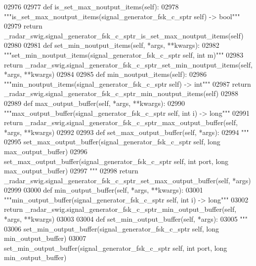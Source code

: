 \begin{DoxyCode}
{{{{{{{{{{{02976 
02977     \textcolor{keyword}{def }is_set_max_noutput_items(self):
02978         \textcolor{stringliteral}{"""is\_set\_max\_noutput\_items(signal\_generator\_fsk\_c\_sptr self) -> bool"""}
02979         \textcolor{keywordflow}{return} \_radar\_swig.signal\_generator\_fsk\_c\_sptr\_is\_set\_max\_noutput\_items(self)
02980 
02981     \textcolor{keyword}{def }set_min_noutput_items(self, *args, **kwargs):
02982         \textcolor{stringliteral}{"""set\_min\_noutput\_items(signal\_generator\_fsk\_c\_sptr self, int m)"""}
02983         \textcolor{keywordflow}{return} \_radar\_swig.signal\_generator\_fsk\_c\_sptr\_set\_min\_noutput\_items(self, *args, **kwargs)
02984 
02985     \textcolor{keyword}{def }min_noutput_items(self):
02986         \textcolor{stringliteral}{"""min\_noutput\_items(signal\_generator\_fsk\_c\_sptr self) -> int"""}
02987         \textcolor{keywordflow}{return} \_radar\_swig.signal\_generator\_fsk\_c\_sptr\_min\_noutput\_items(self)
02988 
02989     \textcolor{keyword}{def }max_output_buffer(self, *args, **kwargs):
02990         \textcolor{stringliteral}{"""max\_output\_buffer(signal\_generator\_fsk\_c\_sptr self, int i) -> long"""}
02991         \textcolor{keywordflow}{return} \_radar\_swig.signal\_generator\_fsk\_c\_sptr\_max\_output\_buffer(self, *args, **kwargs)
02992 
02993     \textcolor{keyword}{def }set_max_output_buffer(self, *args):
02994         \textcolor{stringliteral}{"""}
02995 \textcolor{stringliteral}{        set\_max\_output\_buffer(signal\_generator\_fsk\_c\_sptr self, long max\_output\_buffer)}
02996 \textcolor{stringliteral}{        set\_max\_output\_buffer(signal\_generator\_fsk\_c\_sptr self, int port, long max\_output\_buffer)}
02997 \textcolor{stringliteral}{        """}
02998         \textcolor{keywordflow}{return} \_radar\_swig.signal\_generator\_fsk\_c\_sptr\_set\_max\_output\_buffer(self, *args)
02999 
03000     \textcolor{keyword}{def }min_output_buffer(self, *args, **kwargs):
03001         \textcolor{stringliteral}{"""min\_output\_buffer(signal\_generator\_fsk\_c\_sptr self, int i) -> long"""}
03002         \textcolor{keywordflow}{return} \_radar\_swig.signal\_generator\_fsk\_c\_sptr\_min\_output\_buffer(self, *args, **kwargs)
03003 
03004     \textcolor{keyword}{def }set_min_output_buffer(self, *args):
03005         \textcolor{stringliteral}{"""}
03006 \textcolor{stringliteral}{        set\_min\_output\_buffer(signal\_generator\_fsk\_c\_sptr self, long min\_output\_buffer)}
03007 \textcolor{stringliteral}{        set\_min\_output\_buffer(signal\_generator\_fsk\_c\_sptr self, int port, long min\_output\_buffer)}
}}}}}}}}}}}
\end{DoxyCode}
